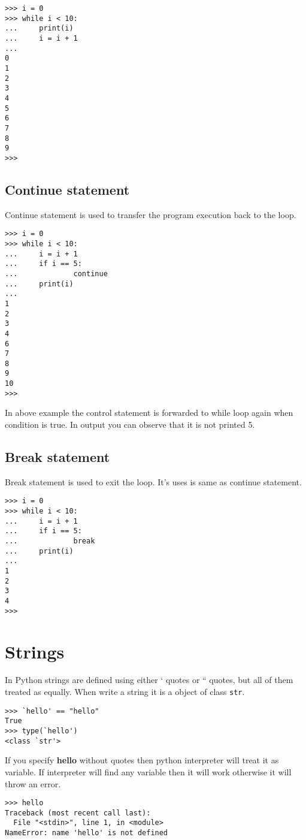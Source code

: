 \documentclass[letterpaper,12pt]{book}
\begin{document}
\begin{lstlisting}
>>> i = 0
>>> while i < 10:
...     print(i)
...     i = i + 1
... 
0
1
2
3
4
5
6
7
8
9
>>> 
\end{lstlisting}

\subsection{Continue statement}
Continue statement is used to transfer the program execution back to the loop.

\begin{lstlisting}
>>> i = 0
>>> while i < 10:
...     i = i + 1
...     if i == 5:
...             continue
...     print(i)
... 
1
2
3
4
6
7
8
9
10
>>> 
\end{lstlisting}
In above example the control statement is forwarded to while loop again when condition is true. In output you can observe that it is not printed 5.

\subsection{Break statement}
Break statement is used to exit the loop. It's uses is same as continue statement.
\begin{lstlisting}
>>> i = 0
>>> while i < 10:
...     i = i + 1
...     if i == 5:
...             break
...     print(i)
... 
1
2
3
4
>>> 
\end{lstlisting}

\section{Strings}
In Python strings are defined using either ` quotes or `` quotes, but all of them treated as equally. When write a string it is a object of class \texttt{str}.
\begin{lstlisting}
>>> `hello' == "hello"
True
>>> type(`hello')
<class `str'>
\end{lstlisting}
If you specify \textbf{hello} without quotes then python interpreter will treat it as variable. If interpreter will find any variable then it will work otherwise it will throw an error.
\begin{lstlisting}
>>> hello
Traceback (most recent call last):
  File "<stdin>", line 1, in <module>
NameError: name 'hello' is not defined
\end{lstlisting}
\end{document}
